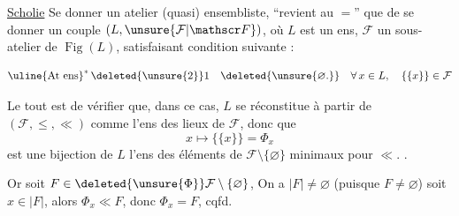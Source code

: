 
\uline{Scholie} Se donner un atelier (quasi) ensembliste, ``revient au $=$'' que de se donner un couple $(L,\unsure{\mathcal F|\mathscr F})$, où $L$ est un ens, $\mathcal F$ un sous-atelier de $\operatorname{Fig}(L)$, satisfaisant  condition suivante :


\[
\text{\uline{At ens}}^{*}\,\deleted{\unsure{2}}1\quad \deleted{\unsure{\varnothing .}}\quad
\forall\,x\in L,\quad\{\{x\}\}\in\mathcal F
\]

 Le tout est de vérifier que, dans ce cas, $L$ se réconstitue à partir de $(\mathcal F,\leq,\ll)$ comme l'ens des lieux de $\mathcal F$, donc que
\[
x\longmapsto\{\{x\}\}=\Phi_x
\]
est une bijection de $L$  l'ens des éléments de $\mathcal F\setminus\{\varnothing\}$ minimaux pour $\ll$. .

Or soit $F\in\deleted{\unsure{\Phi}}\mathcal F\setminus\{\varnothing\}$,    On a $|F|\ne\varnothing$ (puisque $F\ne\varnothing$) soit $x\in |F|$, alors $\Phi_x\ll F$, donc $\Phi_x=F$, cqfd.
